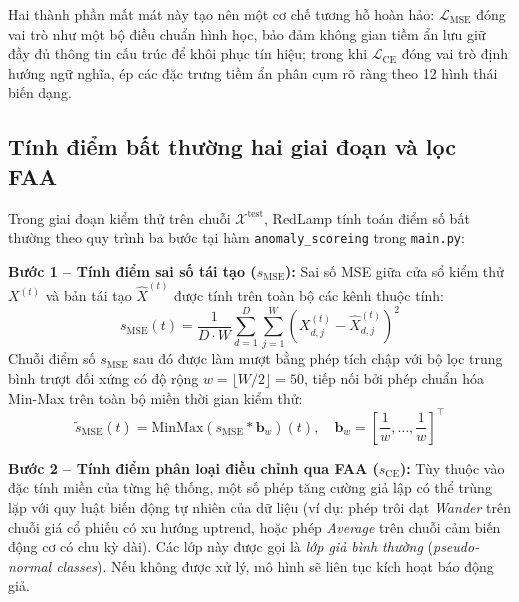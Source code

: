 \documentclass[sigconf,nonacm]{acmart}
\begin{document}
Hai thành phần mất mát này tạo nên một cơ chế tương hỗ hoàn hảo: $\mathcal{L}_{\text{MSE}}$ đóng vai trò như một bộ điều chuẩn hình học, bảo đảm không gian tiềm ẩn lưu giữ đầy đủ thông tin cấu trúc để khôi phục tín hiệu; trong khi $\mathcal{L}_{\text{CE}}$ đóng vai trò định hướng ngữ nghĩa, ép các đặc trưng tiềm ẩn phân cụm rõ ràng theo 12 hình thái biến dạng.

\subsection{Tính điểm bất thường hai giai đoạn và lọc FAA}

Trong giai đoạn kiểm thử trên chuỗi $\mathcal{X}^{\text{test}}$, RedLamp tính toán điểm số bất thường theo quy trình ba bước tại hàm \texttt{anomaly\_scoreing} trong \texttt{main.py}:

\textbf{Bước 1 -- Tính điểm sai số tái tạo ($s_{\text{MSE}}$):}
Sai số MSE giữa cửa sổ kiểm thử $X^{(t)}$ và bản tái tạo $\hat{X}^{(t)}$ được tính trên toàn bộ các kênh thuộc tính:
\begin{equation}
    s_{\text{MSE}}(t) = \frac{1}{D \cdot W} \sum_{d=1}^D \sum_{j=1}^W \left(X_{d, j}^{(t)} - \hat{X}_{d, j}^{(t)}\right)^2
\end{equation}
Chuỗi điểm số $s_{\text{MSE}}$ sau đó được làm mượt bằng phép tích chập với bộ lọc trung bình trượt đối xứng có độ rộng $w = \lfloor W / 2 \rfloor = 50$, tiếp nối bởi phép chuẩn hóa Min-Max trên toàn bộ miền thời gian kiểm thử:
\begin{equation}
    \tilde{s}_{\text{MSE}}(t) = \text{MinMax}\left(s_{\text{MSE}} * \mathbf{b}_w\right)(t),\quad \mathbf{b}_w = \left[\frac{1}{w}, \dots, \frac{1}{w}\right]^\top
\end{equation}

\textbf{Bước 2 -- Tính điểm phân loại điều chỉnh qua FAA ($s_{\text{CE}}$):}
Tùy thuộc vào đặc tính miền của từng hệ thống, một số phép tăng cường giả lập có thể trùng lặp với quy luật biến động tự nhiên của dữ liệu (ví dụ: phép trôi dạt \textit{Wander} trên chuỗi giá cổ phiếu có xu hướng uptrend, hoặc phép \textit{Average} trên chuỗi cảm biến động cơ có chu kỳ dài). Các lớp này được gọi là \textit{lớp giả bình thường} (\textit{pseudo-normal classes}). Nếu không được xử lý, mô hình sẽ liên tục kích hoạt báo động giả.
\end{document}
